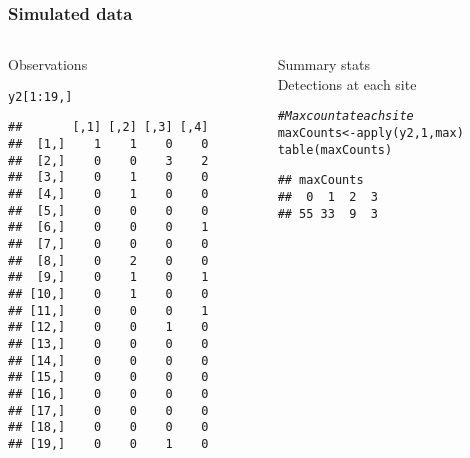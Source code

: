 \documentclass[color=usenames,dvipsnames]{beamer}\usepackage[]{graphicx}\usepackage[]{xcolor}
\makeatletter
\newcommand{\hlnum}[1]{\textcolor[rgb]{0.69,0.494,0}{#1}}%
\newcommand{\hlcom}[1]{\textcolor[rgb]{0.514,0.506,0.514}{\textit{#1}}}%
\newcommand{\hlopt}[1]{\textcolor[rgb]{0,0,0}{#1}}%
\newcommand{\hldef}[1]{\textcolor[rgb]{0,0,0}{#1}}%
\newcommand{\hlkwb}[1]{\textcolor[rgb]{0,0.341,0.682}{#1}}%
\newcommand{\hlkwd}[1]{\textcolor[rgb]{0.004,0.004,0.506}{#1}}%
\newenvironment{kframe}{%
 \def\at@end@of@kframe{}%
 \ifinner\ifhmode%
  \def\at@end@of@kframe{\end{minipage}}%
  \begin{minipage}{\columnwidth}%
 \fi\fi%
 \def\FrameCommand##1{\hskip\@totalleftmargin \hskip-\fboxsep
 \colorbox{shadecolor}{##1}\hskip-\fboxsep
     \hskip-\linewidth \hskip-\@totalleftmargin \hskip\columnwidth}%
 \MakeFramed {\advance\hsize-\width
   \@totalleftmargin\z@ \linewidth\hsize
   \@setminipage}}%
 {\par\unskip\endMakeFramed%
 \at@end@of@kframe}
\newenvironment{knitrout}{}{} %
\makeatother
\begin{document}
\begin{frame}[fragile]
  \frametitle{Simulated data}
  \begin{columns}
    \begin{column}{0.4\textwidth}
      \small
      Observations
\begin{knitrout}\scriptsize
{}\color{fgcolor}\begin{kframe}
\begin{alltt}
\hldef{y2[}\hlnum{1}\hlopt{:}\hlnum{19}\hldef{,]}
\end{alltt}
\begin{verbatim}
##       [,1] [,2] [,3] [,4]
##  [1,]    1    1    0    0
##  [2,]    0    0    3    2
##  [3,]    0    1    0    0
##  [4,]    0    1    0    0
##  [5,]    0    0    0    0
##  [6,]    0    0    0    1
##  [7,]    0    0    0    0
##  [8,]    0    2    0    0
##  [9,]    0    1    0    1
## [10,]    0    1    0    0
## [11,]    0    0    0    1
## [12,]    0    0    1    0
## [13,]    0    0    0    0
## [14,]    0    0    0    0
## [15,]    0    0    0    0
## [16,]    0    0    0    0
## [17,]    0    0    0    0
## [18,]    0    0    0    0
## [19,]    0    0    1    0
\end{verbatim}
\end{kframe}
\end{knitrout}
  \end{column}
  \begin{column}{0.6\textwidth}
    \pause
    {\centering Summary stats \\}
    \vspace{24pt}
  Detections at each site \\
\begin{knitrout}\scriptsize
{}\color{fgcolor}\begin{kframe}
\begin{alltt}
\hlcom{# Max count at each site}
\hldef{maxCounts} \hlkwb{<-} \hlkwd{apply}\hldef{(y2,} \hlnum{1}\hldef{, max)}
\hlkwd{table}\hldef{(maxCounts)}
\end{alltt}
\begin{verbatim}
## maxCounts
##  0  1  2  3 
## 55 33  9  3
\end{verbatim}
\end{kframe}
\end{knitrout}
\pause

\end{column}
\end{columns}
\end{frame}
\end{document}

